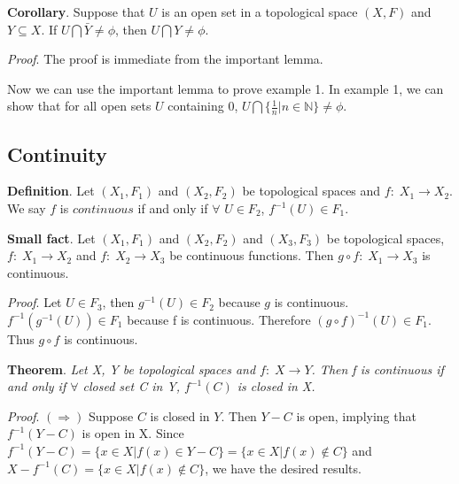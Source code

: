 \documentclass{article}
\begin{document}
\noindent \textbf{Corollary}. Suppose that $U$ is an open set in a
topological space $(X,F)$ and $Y \subseteq X$. If $U \bigcap \bar{Y}
\neq \phi$, then $U \bigcap Y \neq \phi$.

\noindent \textit{Proof}. The proof is immediate from the important
lemma. \vspace{4mm}

Now we can use the important lemma to prove example 1. In example 1,
we can show that for all open sets $U$ containing 0, $U \bigcap
\lbrace \frac{1}{n}|n \in \mathbb{N} \rbrace \neq \phi$.\vspace{8mm}

\subsection*{Continuity}

\noindent \textbf{Definition}. \quad Let $(X_1,F_1)$ and $(X_2,F_2)$
be topological spaces and $f: \; X_1 \longrightarrow X_2$. We say
$f$ is $continuous$ if and only if $\forall$ $U \in F_2$, $f^{-1}(U)
\in F_1$.\vspace{4mm}

\noindent \textbf{Small fact}. \quad Let $(X_1,F_1)$ and $(X_2,F_2)$
and $(X_3,F_3)$ be topological spaces, $f: \; X_1 \longrightarrow
X_2$ and $f: \; X_2 \longrightarrow X_3$ be continuous functions.
Then $g \circ f: \;X_1 \longrightarrow X_3$ is continuous.

\noindent \textit{Proof}. \quad Let $U \in F_3$, then $g^{-1}(U) \in
F_2$ because $g$ is continuous. $f^{-1}(g^{-1}(U)) \in F_1$ because
f is continuous. Therefore $(g \circ f)^{-1}(U) \in F_1$. Thus $g
\circ f$ is continuous. \vspace{4mm}

\noindent \textbf{Theorem}. \quad \textit{Let X, Y be topological
spaces and $f: \; X \longrightarrow Y$. Then f is continuous if and
only if $\forall$ closed set C in Y, $f^{-1}(C)$ is closed in
X.}\vspace{2mm}

\noindent \textit{Proof}. \quad $(\Longrightarrow)$ Suppose $C$ is
closed in $Y$. Then $Y-C$ is open, implying that $f^{-1}(Y-C)$ is
open in X. Since $f^{-1}(Y-C)=\lbrace x \in X|f(x) \in Y-C \rbrace =
\lbrace x \in X|f(x) \notin C \rbrace$ and $X-f^{-1}(C)= \lbrace x
\in X|f(x) \notin C \rbrace$, we have the desired results.
\end{document}
